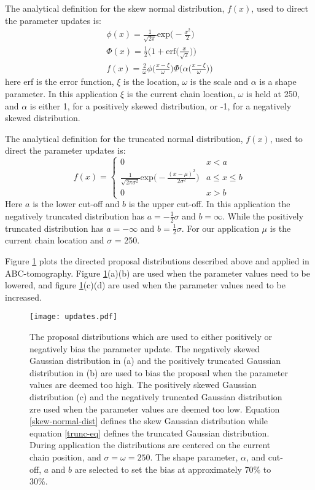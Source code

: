 The analytical definition for the skew normal distribution, $f(x)$, used to direct the parameter updates is:
\begin{equation}
\begin{split}
\phi(x) = \frac{1}{\sqrt{2\pi}}\text{exp}\Big(-\frac{x^2}{2}\Big) \\
\Phi(x) = \frac{1}{2}\bigg(1 + \text{erf}\Big(\frac{x}{\sqrt{2}}\Big)\bigg)\\
f(x) = \frac{2}{\omega} \phi\bigg(\frac{x-\xi}{\omega}\bigg)\Phi\bigg(\alpha \Big(\frac{x-\xi}{\omega}\Big)\bigg)
\end{split}
\label{skew-normal-dist}
\end{equation}
here erf is the error function, $\xi$ is the location, $\omega$ is the scale and $\alpha$ is a shape parameter. In this application  $\xi$ is the current chain location, $\omega$ is held at 250, and $\alpha$ is either 1, for a positively skewed distribution, or -1, for a negatively skewed distribution. \par
The analytical definition for the truncated normal distribution, $f(x)$, used to direct the parameter updates is:
\begin{equation}
	f(x) = \begin{cases} 
	0 & x < a \\
	\frac{1}{\sqrt{2\pi\sigma^2}}\text{exp}\Big(-\frac{(x-\mu)^2}{2\sigma^2}\Big) & a\leq x\leq b \\
	0 & x > b 
	\end{cases}
	\label{trunc-eq}
\end{equation}
Here $a$ is the lower cut-off and $b$ is the upper cut-off. In this application the negatively truncated distribution has $a = -\frac{1}{2}\sigma$ and $b = \infty$. While the positively truncated distribution has $a = -\infty$ and $b = \frac{1}{2}\sigma$. For our application $\mu$ is the current chain location and $\sigma$ = 250. \par
Figure \ref{updates} plots the directed proposal distributions described above and applied in ABC-tomography. Figure \ref{updates}(a)(b) are used when the parameter values need to be lowered, and figure \ref{updates}(c)(d) are used when the parameter values need to be increased. 

\begin{figure}[H]
	\centering
	\texttt{[image: updates.pdf]}
	\caption{The proposal distributions which are used to either positively or negatively bias the parameter update. The negatively skewed Gaussian distribution in (a) and the positively truncated Gaussian distribution in (b) are used to bias the proposal when the parameter values are deemed too high. The positively skewed Gaussian distribution (c) and the negatively truncated Gaussian distribution zre used when the parameter values are deemed too low. Equation \ref{skew-normal-dist} defines the skew Gaussian distribution while equation \ref{trunc-eq} defines the truncated Gaussian distribution. During application the distributions are centered on the current chain position, and $\sigma = \omega = 250$. The shape parameter, $\alpha$, and cut-off, $a$ and $b$ are selected to set the bias at approximately 70\% to 30\%.}
	\label{updates}
\end{figure}

